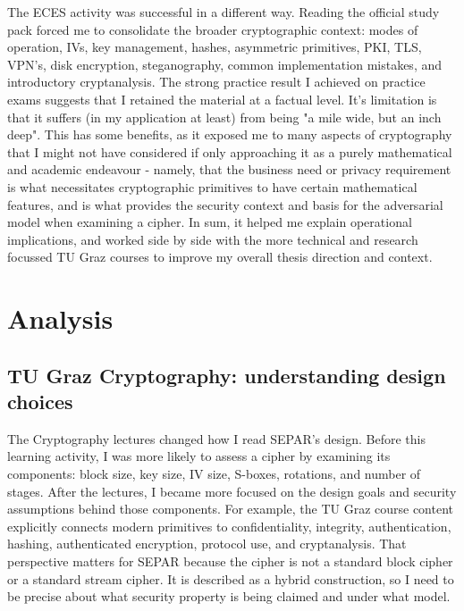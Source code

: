 \documentclass[11pt]{article}
\begin{document}
The ECES activity was successful in a different way. Reading the official study pack forced me to consolidate the broader cryptographic context: modes of operation, IVs, key management, hashes, asymmetric primitives, PKI, TLS, VPN's, disk encryption, steganography, common implementation mistakes, and introductory cryptanalysis. The strong practice result I achieved on practice exams suggests that I retained the material at a factual level. It's limitation is that it suffers (in my application at least) from being "a mile wide, but an inch deep". This has some benefits, as it exposed me to many aspects of cryptography that I might not have considered if only approaching it as a purely mathematical and academic endeavour - namely, that the business need or privacy requirement is what necessitates cryptographic primitives to have certain mathematical features, and is what provides the security context and basis for the adversarial model when examining a cipher. In sum, it helped me explain operational implications, and worked side by side with the more technical and research focussed TU Graz courses to improve my overall thesis direction and context.

\section*{Analysis}

\subsection*{TU Graz Cryptography: understanding design choices}

The Cryptography lectures changed how I read SEPAR's design. Before this learning activity, I was more likely to assess a cipher by examining its components: block size, key size, IV size, S-boxes, rotations, and number of stages. After the lectures, I became more focused on the design goals and security assumptions behind those components. For example, the TU Graz course content explicitly connects modern primitives to confidentiality, integrity, authentication, hashing, authenticated encryption, protocol use, and cryptanalysis. That perspective matters for SEPAR because the cipher is not a standard block cipher or a standard stream cipher. It is described as a hybrid construction, so I need to be precise about what security property is being claimed and under what model.
\end{document}
